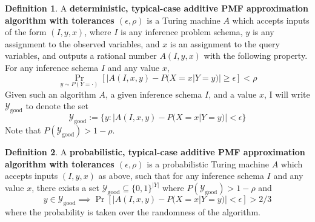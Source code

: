 \documentclass{article}
\def \Ygood{\mathcal{Y}_\text{good}}
\theoremstyle{definition}
\newtheorem{defn}{Definition}
\theoremstyle{remark}
\begin{document}


\begin{defn} \label{def:typical_case_add_alg}
A \textbf{deterministic, typical-case additive PMF approximation algorithm with tolerances $(\epsilon, \rho)$} is a Turing machine $A$ which accepts inputs of the form
$(I, y, x)$, where $I$ is any inference problem schema, $y$ is any assignment to the observed variables, and $x$ is an assignment to the query variables, and outputs a rational number $A(I, y, x)$ with the following property.
For any inference schema $I$ and any value $x$,
$$
\Pr_{y \sim P(Y = \cdot)}[|A(I, x, y) - P(X = x | Y = y)| \geq \epsilon] < \rho
$$
Given such an algorithm $A$, a given inference schema $I$, and a value $x$, I will write $\Ygood$ to denote the set
$$
\Ygood := \{y : |A(I, x, y) - P(X = x | Y = y)| < \epsilon\}
$$
Note that $P(\Ygood) > 1 - \rho$.
\end{defn}
\begin{defn}
A \textbf{probabilistic, typical-case additive PMF approximation algorithm with tolerances $(\epsilon, \rho)$} is a probabilistic Turing machine $A$ which accepts inputs $(I, y, x)$ as above, such that for any inference schema $I$ and any value $x$, there exists a set $\Ygood \subseteq \{0, 1\}^{|Y|}$ where $P(\Ygood) > 1 - \rho$ and
$$
y \in \Ygood \implies \Pr[|A(I, x, y) - P(X = x | Y = y)| < \epsilon] > 2/3
$$
where the probability is taken over the randomness of the algorithm.
\end{defn}
\end{document}
